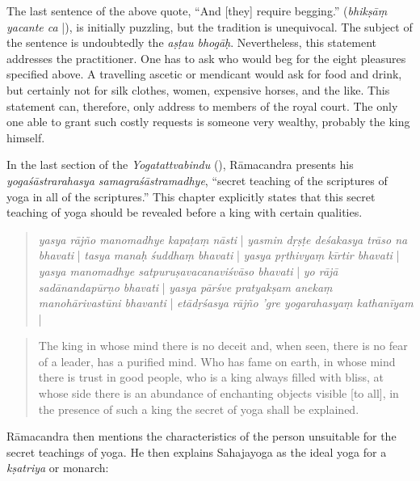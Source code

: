 The last sentence of the above quote, ``And [they] require begging.'' (\textit{bhikṣāṃ yacante ca} |), is initially puzzling, but the tradition is unequivocal. The subject of the sentence is undoubtedly the \textit{aṣṭau bhogāḥ}. Nevertheless, this statement addresses the practitioner. One has to ask who would beg for the eight pleasures specified above. A travelling ascetic or mendicant would ask for food and drink, but certainly not for silk clothes, women, expensive horses, and the like. This statement can, therefore, only address to members of the royal court. The only one able to grant such costly requests is someone very wealthy, probably the king himself.

In the last section of the \emph{Yogatattvabindu} (), Rāmacandra presents his \textit{yogaśāstrarahasya samagraśāstramadhye}, ``secret teaching of the scriptures of yoga in all of the scriptures.'' This chapter explicitly states that this secret teaching of yoga should be revealed before a king with certain qualities.

\begin{quote}
\textit{yasya rājño manomadhye kapaṭaṃ nāsti} | \textit{yasmin dṛṣṭe deśakasya trāso na bhavati} | \textit{tasya manaḥ śuddhaṃ bhavati} | \textit{yasya pṛthivyaṃ kīrtir bhavati} | \textit{yasya manomadhye satpuruṣavacanaviśvāso bhavati} | \textit{yo rājā sadānandapūrṇo bhavati} | \textit{yasya pārśve pratyakṣam anekaṃ manohārivastūni bhavanti} | \textit{etādṛśasya rājño 'gre yogarahasyaṃ kathanīyam} | 
\end{quote}
\begin{quote}
The king in whose mind there is no deceit and, when seen, there is no fear of a leader, has a purified mind. Who has fame on earth, in whose mind there is trust in good people, who is a king always filled with bliss, at whose side there is an abundance of enchanting objects visible [to all], in the presence of such a king the secret of yoga shall be explained.
\end{quote} 

Rāmacandra then mentions the characteristics of the person unsuitable for the secret teachings of yoga. He then explains Sahajayoga as the ideal yoga for a \textit{kṣatriya} or monarch:

